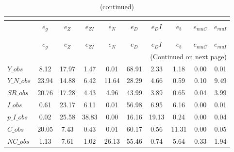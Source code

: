  
\begin{center}
\begin{longtable}{lccccccccc} 
\caption{VARIANCE DECOMPOSITION (in percent)}\\
 \label{Table:th_var_decomp_uncond}\\
\toprule 
$               $	 & 	 $        {e_g}$	 & 	 $        {e_Z}$	 & 	 $     {e_{ZI}}$	 & 	 $        {e_N}$	 & 	 $        {e_D}$	 & 	 $       {e_DI}$	 & 	 $        {e_b}$	 & 	 $    {e_{muC}}$	 & 	 $    {e_{muI}}$\\
\midrule \endfirsthead 
\caption{(continued)}\\
 \toprule \\ 
$               $	 & 	 $        {e_g}$	 & 	 $        {e_Z}$	 & 	 $     {e_{ZI}}$	 & 	 $        {e_N}$	 & 	 $        {e_D}$	 & 	 $       {e_DI}$	 & 	 $        {e_b}$	 & 	 $    {e_{muC}}$	 & 	 $    {e_{muI}}$\\
\midrule \endhead 
\midrule \multicolumn{10}{r}{(Continued on next page)} \\ \bottomrule \endfoot 
\bottomrule \endlastfoot 
$Y\_obs         $	 & 	         8.12	 & 	        17.97	 & 	         1.47	 & 	         0.01	 & 	        68.91	 & 	         2.33	 & 	         1.18	 & 	         0.00	 & 	         0.01 \\ 
$Y\_N\_obs      $	 & 	        23.94	 & 	        14.88	 & 	         6.42	 & 	        11.64	 & 	        28.29	 & 	         4.66	 & 	         0.59	 & 	         0.10	 & 	         9.49 \\ 
$SR\_obs        $	 & 	        20.76	 & 	        17.28	 & 	         4.43	 & 	         4.96	 & 	        43.99	 & 	         3.89	 & 	         0.65	 & 	         0.04	 & 	         3.99 \\ 
$I\_obs         $	 & 	         0.61	 & 	        23.17	 & 	         6.11	 & 	         0.01	 & 	        56.98	 & 	         6.95	 & 	         6.16	 & 	         0.00	 & 	         0.01 \\ 
$p\_I\_obs      $	 & 	         0.02	 & 	        25.58	 & 	        38.83	 & 	         0.00	 & 	        16.16	 & 	        19.13	 & 	         0.24	 & 	         0.00	 & 	         0.04 \\ 
$C\_obs         $	 & 	        20.05	 & 	         7.43	 & 	         0.43	 & 	         0.01	 & 	        60.17	 & 	         0.56	 & 	        11.31	 & 	         0.00	 & 	         0.05 \\ 
$NC\_obs        $	 & 	         1.13	 & 	         7.61	 & 	         1.02	 & 	        26.13	 & 	        55.46	 & 	         0.74	 & 	         5.64	 & 	         0.33	 & 	         1.94 \\ 

\end{longtable}
\end{center}
